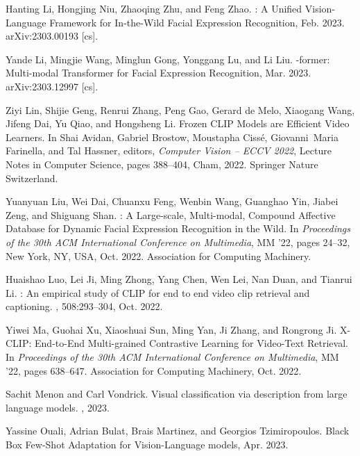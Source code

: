 \documentclass[10pt,twocolumn,letterpaper]{article}
\begin{document}
{\begin{thebibliography}{10}
Hanting Li, Hongjing Niu, Zhaoqing Zhu, and Feng Zhao.
: {A} {Unified} {Vision}-{Language} {Framework} for
  {In}-the-{Wild} {Facial} {Expression} {Recognition}, Feb. 2023.
\newblock arXiv:2303.00193 [cs].

Yande Li, Mingjie Wang, Minglun Gong, Yonggang Lu, and Li Liu.
-former: {Multi}-modal {Transformer} for {Facial} {Expression}
  {Recognition}, Mar. 2023.
\newblock arXiv:2303.12997 [cs].

Ziyi Lin, Shijie Geng, Renrui Zhang, Peng Gao, Gerard de Melo, Xiaogang Wang,
  Jifeng Dai, Yu Qiao, and Hongsheng Li.
\newblock Frozen {CLIP} {Models} are {Efficient} {Video} {Learners}.
\newblock In Shai Avidan, Gabriel Brostow, Moustapha Cissé, Giovanni~Maria
  Farinella, and Tal Hassner, editors, {\em Computer {Vision} – {ECCV} 2022},
  Lecture {Notes} in {Computer} {Science}, pages 388--404, Cham, 2022. Springer
  Nature Switzerland.

Yuanyuan Liu, Wei Dai, Chuanxu Feng, Wenbin Wang, Guanghao Yin, Jiabei Zeng,
  and Shiguang Shan.
: {A} {Large}-scale, {Multi}-modal, {Compound} {Affective}
  {Database} for {Dynamic} {Facial} {Expression} {Recognition} in the {Wild}.
\newblock In {\em Proceedings of the 30th {ACM} {International} {Conference} on
  {Multimedia}}, {MM} '22, pages 24--32, New York, NY, USA, Oct. 2022.
  Association for Computing Machinery.

Huaishao Luo, Lei Ji, Ming Zhong, Yang Chen, Wen Lei, Nan Duan, and Tianrui Li.
: {An} empirical study of {CLIP} for end to end video clip
  retrieval and captioning.
, 508:293--304, Oct. 2022.

Yiwei Ma, Guohai Xu, Xiaoshuai Sun, Ming Yan, Ji Zhang, and Rongrong Ji.
\newblock X-{CLIP}: {End}-to-{End} {Multi}-grained {Contrastive} {Learning} for
  {Video}-{Text} {Retrieval}.
\newblock In {\em Proceedings of the 30th {ACM} {International} {Conference} on
  {Multimedia}}, {MM} '22, pages 638--647. Association for Computing Machinery,
  Oct. 2022.

Sachit Menon and Carl Vondrick.
\newblock Visual classification via description from large language models.
, 2023.

Yassine Ouali, Adrian Bulat, Brais Martinez, and Georgios Tzimiropoulos.
\newblock Black {Box} {Few}-{Shot} {Adaptation} for {Vision}-{Language} models,
  Apr. 2023.


\end{thebibliography}}
\end{document}
